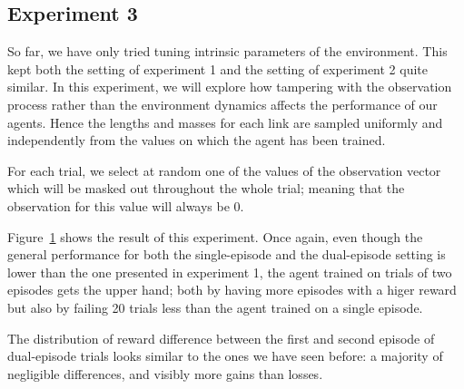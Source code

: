 \documentclass[letterpaper]{article}
\begin{document}
\subsection{Experiment 3}
So far, we have only tried tuning intrinsic parameters of the environment. This
kept both the setting of experiment 1 and the setting of experiment 2 quite
similar. In this experiment, we will explore how tampering with the
observation process rather than the environment dynamics affects the performance
of our agents. Hence the lengths and masses for each link are sampled 
uniformly and independently from the values on which the agent has been trained.

For each trial, we select at random one of the values of the observation vector
which will be masked out throughout the whole trial; meaning that the
observation for this value will always be 0. 

Figure~\ref{fig:distrib_mask} shows the result of this experiment. Once again,
even though the general performance for both the single-episode and the
dual-episode setting is lower than the one presented in experiment 1, the
agent trained on trials of two episodes gets the upper hand; both by
having more episodes with a higer reward but also by failing 20 trials less
than the agent trained on a single episode.

The distribution of reward difference between the first and second episode
of dual-episode trials looks similar to the ones we have seen before: a
majority of negligible differences, and visibly more gains than losses.
\begin{figure}
	\centering
	\caption{}
	\label{fig:distrib_mask}
\end{figure}
\end{document}

